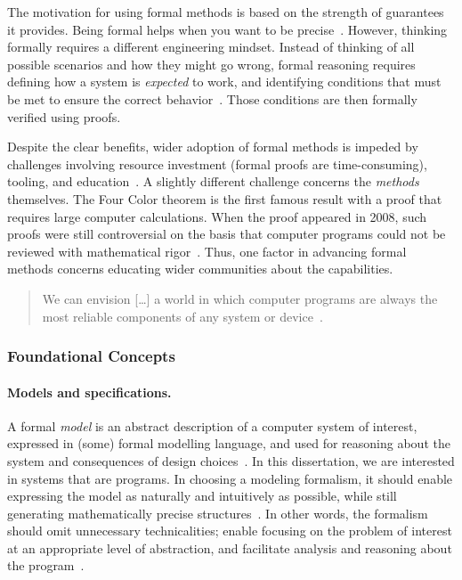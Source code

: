 The motivation for using formal methods is based on the strength of guarantees it provides.
Being formal helps when you want to be precise~\cite{leino2023}.
However, thinking formally requires a different engineering mindset.
Instead of thinking of all possible scenarios and how they might go wrong, formal reasoning requires defining how a system is \emph{expected} to work, and identifying conditions that must be met to ensure the correct behavior~\cite{aws2024}.
Those conditions are then formally verified using proofs.

Despite the clear benefits, wider adoption of formal methods is impeded by challenges involving \eg resource investment (formal proofs are time-consuming), tooling, and education~\cite{beek2024}.
A slightly different challenge concerns the \emph{methods} themselves.
The Four Color theorem is the first famous result with a proof that requires large computer calculations.
When the proof appeared in 2008, such proofs were still controversial on the basis that computer programs could not be reviewed with mathematical rigor~\cite{gonthier2008}.
Thus, one factor in advancing formal methods concerns educating wider communities about the capabilities.

\begin{quotation}
\noindent{}We can envision [\ldots] a world in which computer programs are always the most reliable components of any system or device~\cite{hoare2007}.
\end{quotation}

\subsubsection{Foundational Concepts}
\label{subsubsec:verification-concepts}

\paragraph*{Models and specifications.}
A formal \emph{model} is an abstract description of a computer system of interest, expressed in (some) formal modelling language,
and used for reasoning about the system and consequences of design choices~\cite{zave2023,olveczky2017}.
In this dissertation, we are interested in systems that are programs.
In choosing a modeling formalism, it should enable expressing the model as naturally and intuitively as possible,
while still generating mathematically precise structures~\cite{olveczky2017,beek2024}.
In other words, the formalism should omit unnecessary technicalities;
enable focusing on the problem of interest at an appropriate level of abstraction,
and facilitate analysis and reasoning about the program~\cite{olveczky2017}.

